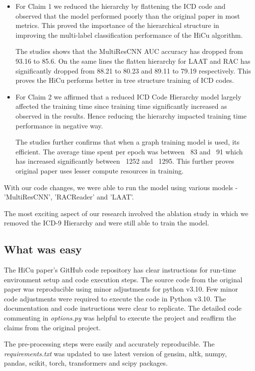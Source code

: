 \documentclass[11pt,a4paper]{article}
\begin{document}
\begin{itemize}
    \item For Claim 1 we reduced the hierarchy by flattening the ICD code and observed that the model performed poorly than the original paper in most metrics. This proved the importance of the hierarchical structure in improving the multi-label classification performance of the HiCu algorithm.

    The studies shows that the MultiResCNN AUC accuracy has dropped from 93.16 to 85.6. On the same lines the flatten hierarchy for LAAT and RAC has significantly dropped from 88.21 to 80.23 and 89.11 to 79.19 respectively. This proves the HiCu performs better in tree structure training of ICD codes.
    
    \item For Claim 2 we affirmed that a reduced ICD Code Hierarchy model largely affected the training time since training time significantly increased as observed in the results. Hence reducing the hierarchy impacted training time performance in negative way.

    The studies further confirms that when a graph training model is used, its efficient. The average time spent per epoch was between ~83 and ~91 which has increased significantly between ~1252 and ~1295. This further proves original paper uses lesser compute resources in training.
\end{itemize}

With our code changes, we were able to run the model using various models - 'MultiResCNN', 'RACReader' and 'LAAT'. 

The most exciting aspect of our research involved the ablation study in which we removed the ICD-9 Hierarchy and were still able to train the model.

\subsection{What was easy}
The HiCu paper's GitHub code repository has clear instructions for run-time environment setup and code execution steps. 
The source code from the original paper was reproducible using minor adjustments for python v3.10. Few minor code adjustments were required to execute the code in Python v3.10. The documentation and code instructions were clear to replicate. The detailed code commenting in \textit{options.py} was helpful to execute the project and reaffirm the claims from the original project.

The pre-processing steps were easily and accurately reproducible. The \textit{requirements.txt} was updated to use latest version of gensim, nltk, numpy, pandas, scikit, torch, transformers and scipy packages.
\end{document}
